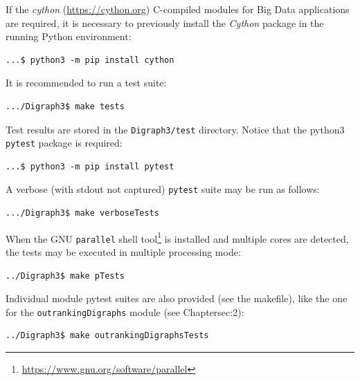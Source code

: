 If the \emph{cython} (\href{https://cython.org}{https://cython.org}) C-compiled modules for Big Data applications are required, it is necessary to previously install the \emph{Cython} package in the running Python environment:
\begin{footnotesize}
\begin{verbatim}
...$ python3 -m pip install cython
\end{verbatim}
\end{footnotesize}
It is recommended to run a test suite:
\begin{footnotesize}
\begin{verbatim}
.../Digraph3$ make tests
\end{verbatim}
\end{footnotesize}
Test results are stored in the \texttt{Digraph3/test} directory. Notice that the python3 \texttt{pytest} package is required:
\begin{footnotesize}
\begin{verbatim}
...$ python3 -m pip install pytest
\end{verbatim}
\end{footnotesize}
A verbose (with stdout not captured) \texttt{pytest} suite may be run as follows:
\begin{footnotesize}
\begin{verbatim}
.../Digraph3$ make verboseTests
\end{verbatim}
\end{footnotesize}
When the GNU \texttt{parallel} shell tool\footnote{\href{https://www.gnu.org/software/parallel}{https://www.gnu.org/software/parallel}} is installed and multiple cores are detected, the tests may be executed in multiple processing mode:
\begin{footnotesize}
\begin{verbatim}
../Digraph3$ make pTests 
\end{verbatim}
\end{footnotesize}
Individual module pytest suites are also provided (see the makefile), like the one for the \texttt{outrankingDigraphs} module (see Chapter{sec:2}):
\begin{footnotesize}
\begin{verbatim}
../Digraph3$ make outrankingDigraphsTests
\end{verbatim}
\end{footnotesize}

